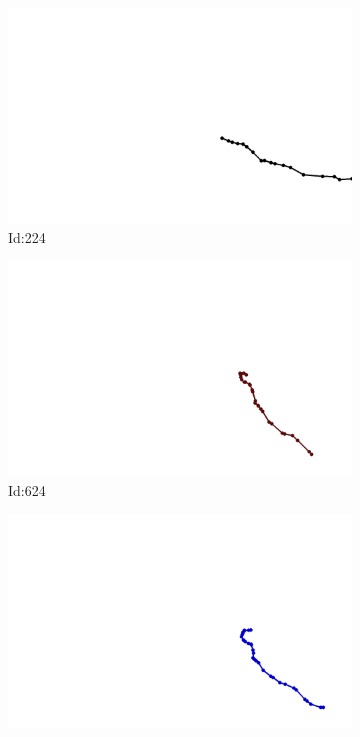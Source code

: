 \documentclass[12pt,twoside]{report}
\begin{document}
\begin{figure}
\centering
\begin{subfigure}[b]{0.20\textwidth}
\centering
\includegraphics[width=\textwidth]{../../trajectories/224.png}
\caption{Id:224}
\end{subfigure}
\begin{subfigure}[b]{0.20\textwidth}
\centering
\includegraphics[width=\textwidth]{../../trajectories/624.png}
\caption{Id:624}
\end{subfigure}
\begin{subfigure}[b]{0.20\textwidth}
\centering
\includegraphics[width=\textwidth]{../../trajectories/924.png}

\end{subfigure}
\end{figure}
\end{document}
